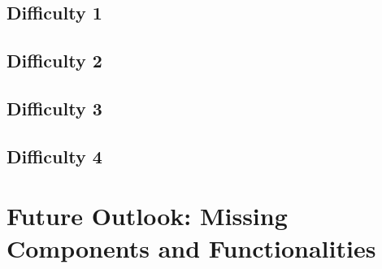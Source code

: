 \section{Difficulty 1}
\section{Difficulty 2}
\section{Difficulty 3}
\section{Difficulty 4}
\chapter{Future Outlook: Missing Components and Functionalities}



